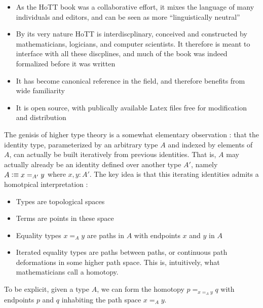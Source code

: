 \documentclass[11pt, a4paper]{article}
\newcommand{\defeq}{\vcentcolon\equiv}  %
\begin{document}
\begin{itemize}[noitemsep]

\item As the HoTT book was a collaborative effort, it mixes the language of
many individuals and editors, and can be seen as more ``linguistically
neutral''

\item By its very nature HoTT is interdiscplinary, conceived and constructed by
mathematicians, logicians, and computer scientists. It therefore is meant to
interface with all these discplines, and much of the book was indeed formalized
before it was written

\item It has become canonical reference in the field, and therefore benefits
from wide familiarity

\item It is open source, with publically available Latex files free for
modification and distribution

\end{itemize}

The genisis of higher type theory is a somewhat elementary observation : that
the identity type, parameterized by an arbitrary type $A$ and indexed by
elements of $A$, can actually be built iteratively from previous identities.
That is, $A$ may actually already be an identity defined over another type
$A'$, namely $A \defeq x=_{A'} y$ where $x,y:A'$. The key idea is that this
iterating identities admits a homotpical interpretation : 

\begin{itemize}[noitemsep]

\item Types are topological spaces
\item Terms are points in these space

\item Equality types $x=_{A} y$ are paths in $A$ with endpoints $x$ and $y$ in
$A$

\item Iterated equality types are paths between paths, or continuous path
deformations in some higher path space. This is, intuitively, what
mathematicians call a homotopy.

\end{itemize}

To be explicit, given a type $A$, we can form the homotopy $p=_{x=_{A} y}q$
with endpoints $p$ and $q$ inhabiting the path space $x=_{A} y$.
\end{document}
